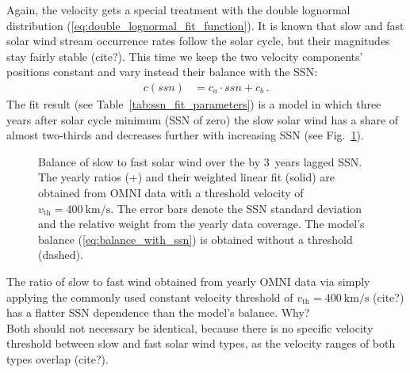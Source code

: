 Again, the velocity gets a special treatment with the double lognormal distribution (\ref{eq:double_lognormal_fit_function}). It is known that slow and fast solar wind stream occurrence rates follow the solar cycle, but their magnitudes stay fairly stable (cite?). This time we keep the two velocity components' positions constant and vary instead their balance with the SSN:
\begin{align}
	c(ssn) &= c_a \cdot ssn + c_b\,.	\label{eq:balance_with_ssn}
\end{align}
The fit result (see Table~\ref{tab:ssn_fit_parameters}) is a model in which three years after solar cycle minimum (SSN of zero) the slow solar wind has a share of almost two-thirds and decreases further with increasing SSN (see Fig.~\ref{fig:Vdbl_SSN_ratio_e_plot}).\\
\begin{figure}
	\caption{Balance of slow to fast solar wind over the by 3~years lagged SSN. The yearly ratios (+) and their weighted linear fit (solid) are obtained from OMNI data with a threshold velocity of $v_\text{th} = \SI{400}{\km\per\s}$. The error bars denote the SSN standard deviation and the relative weight from the yearly data coverage. The model's balance (\ref{eq:balance_with_ssn}) is obtained without a threshold (dashed).}
	\label{fig:Vdbl_SSN_ratio_e_plot}
\end{figure}
The ratio of slow to fast wind obtained from yearly OMNI data via simply applying the commonly used constant velocity threshold of $v_\text{th} = \SI{400}{\km\per\s}$ (cite?) has a flatter SSN dependence than the model's balance. Why?\\
Both should not necessary be identical, because there is no specific velocity threshold between slow and fast solar wind types, as the velocity ranges of both types overlap (cite?).\\


